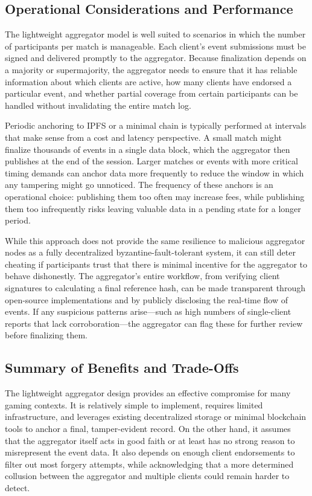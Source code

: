 \documentclass[11pt]{article}
\begin{document}
\subsection{Operational Considerations and Performance}
The lightweight aggregator model is well suited to scenarios in which the number of participants per match is manageable. Each client’s event submissions must be signed and delivered promptly to the aggregator. Because finalization depends on a majority or supermajority, the aggregator needs to ensure that it has reliable information about which clients are active, how many clients have endorsed a particular event, and whether partial coverage from certain participants can be handled without invalidating the entire match log.

Periodic anchoring to IPFS or a minimal chain is typically performed at intervals that make sense from a cost and latency perspective. A small match might finalize thousands of events in a single data block, which the aggregator then publishes at the end of the session. Larger matches or events with more critical timing demands can anchor data more frequently to reduce the window in which any tampering might go unnoticed. The frequency of these anchors is an operational choice: publishing them too often may increase fees, while publishing them too infrequently risks leaving valuable data in a pending state for a longer period.

While this approach does not provide the same resilience to malicious aggregator nodes as a fully decentralized byzantine-fault-tolerant system, it can still deter cheating if participants trust that there is minimal incentive for the aggregator to behave dishonestly. The aggregator’s entire workflow, from verifying client signatures to calculating a final reference hash, can be made transparent through open-source implementations and by publicly disclosing the real-time flow of events. If any suspicious patterns arise—such as high numbers of single-client reports that lack corroboration—the aggregator can flag these for further review before finalizing them.

\subsection{Summary of Benefits and Trade-Offs}
The lightweight aggregator design provides an effective compromise for many gaming contexts. It is relatively simple to implement, requires limited infrastructure, and leverages existing decentralized storage or minimal blockchain tools to anchor a final, tamper-evident record. On the other hand, it assumes that the aggregator itself acts in good faith or at least has no strong reason to misrepresent the event data. It also depends on enough client endorsements to filter out most forgery attempts, while acknowledging that a more determined collusion between the aggregator and multiple clients could remain harder to detect.
\end{document}
